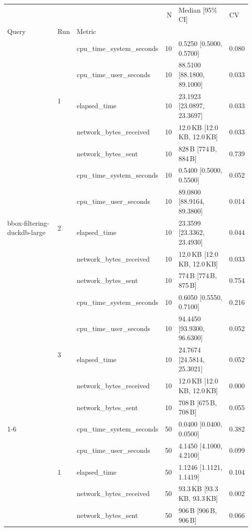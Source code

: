 \begin{tabular}{lllrll}
\toprule
 &  &  & N & Median [95\% CI] & CV \\
Query & Run & Metric &  &  &  \\
\midrule
\multirow[t]{15}{*}{bbox-filtering-duckdb-large} & \multirow[t]{5}{*}{1} & cpu_time_system_seconds & 10 & 0.5250 [0.5000, 0.5700] & 0.080 \\
 &  & cpu_time_user_seconds & 10 & 88.5100 [88.1800, 89.1000] & 0.033 \\
 &  & elapsed_time & 10 & 23.1923 [23.0897, 23.3697] & 0.033 \\
 &  & network_bytes_received & 10 & 12.0\,KB [12.0\,KB, 12.0\,KB] & 0.033 \\
 &  & network_bytes_sent & 10 & 828\,B [774\,B, 884\,B] & 0.739 \\
\cline{2-6}
 & \multirow[t]{5}{*}{2} & cpu_time_system_seconds & 10 & 0.5400 [0.5000, 0.5500] & 0.052 \\
 &  & cpu_time_user_seconds & 10 & 89.0800 [88.9164, 89.3800] & 0.014 \\
 &  & elapsed_time & 10 & 23.3599 [23.3362, 23.4930] & 0.044 \\
 &  & network_bytes_received & 10 & 12.0\,KB [12.0\,KB, 12.0\,KB] & 0.033 \\
 &  & network_bytes_sent & 10 & 774\,B [774\,B, 875\,B] & 0.754 \\
\cline{2-6}
 & \multirow[t]{5}{*}{3} & cpu_time_system_seconds & 10 & 0.6050 [0.5550, 0.7100] & 0.216 \\
 &  & cpu_time_user_seconds & 10 & 94.4450 [93.9300, 96.6300] & 0.052 \\
 &  & elapsed_time & 10 & 24.7674 [24.5814, 25.3021] & 0.052 \\
 &  & network_bytes_received & 10 & 12.0\,KB [12.0\,KB, 12.0\,KB] & 0.000 \\
 &  & network_bytes_sent & 10 & 708\,B [675\,B, 708\,B] & 0.055 \\
\cline{1-6} \cline{2-6}
\multirow[t]{15}{*}{bbox-filtering-duckdb-small} & \multirow[t]{5}{*}{1} & cpu_time_system_seconds & 50 & 0.0400 [0.0400, 0.0500] & 0.382 \\
 &  & cpu_time_user_seconds & 50 & 4.1450 [4.1000, 4.2100] & 0.099 \\
 &  & elapsed_time & 50 & 1.1246 [1.1121, 1.1419] & 0.104 \\
 &  & network_bytes_received & 50 & 93.3\,KB [93.3\,KB, 93.3\,KB] & 0.002 \\
 &  & network_bytes_sent & 50 & 906\,B [906\,B, 906\,B] & 0.066 \\

\end{tabular}
